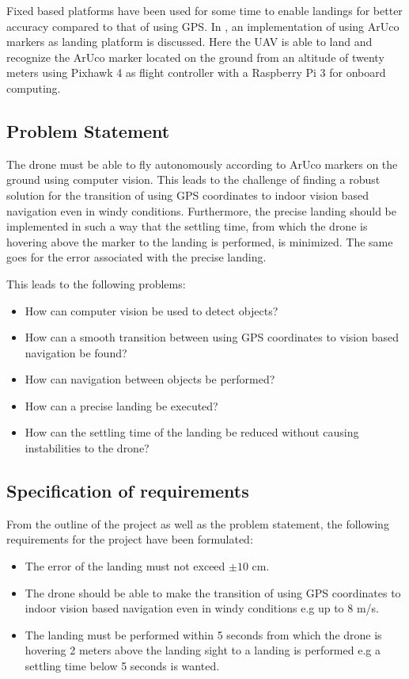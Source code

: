 \documentclass[../Head/report.tex]{subfiles}
\begin{document}
Fixed based platforms have been used for some time to enable landings for better accuracy compared to that of using GPS. In \cite{AVisionBasedSystemForAutonomousVerticaLanding}, an implementation of using ArUco markers as landing platform is discussed. Here the UAV is able to land and recognize the ArUco marker located on the ground from an altitude of twenty meters using Pixhawk 4 as flight controller with a Raspberry Pi 3 for onboard computing.   
  

\subsection{Problem Statement}

The drone must be able to fly autonomously according to ArUco markers on the ground using computer vision. This leads to the challenge of finding a robust solution for the transition of using GPS coordinates to indoor vision based navigation even in windy conditions. Furthermore, the precise landing should be implemented in such a way that the settling time, from which the drone is hovering above the marker to the landing is performed, is minimized. The same goes for the error associated with the precise landing.  

This leads to the following problems:

\begin{itemize}
    \item How can computer vision be used to detect objects?
    \item How can a smooth transition between using GPS coordinates to vision based navigation be found?
    \item How can navigation between objects be performed?
    \item How can a precise landing be executed?
    \item How can the settling time of the landing be reduced without causing instabilities to the drone?
    
\end{itemize} 

\subsection{Specification of requirements}

From the outline of the project as well as the problem statement, the following requirements for the project have been formulated:

\begin{itemize}
    \item The error of the landing must not exceed $\pm 10$ cm. 
    \item The drone should be able to make the transition of using GPS coordinates to indoor vision based navigation even in windy conditions e.g up to 8 m/s.
    \item The landing must be performed within 5 seconds from which the drone is hovering 2 meters above the landing sight to a landing is performed e.g a settling time below 5 seconds is wanted.   

\end{itemize}
\end{document}

